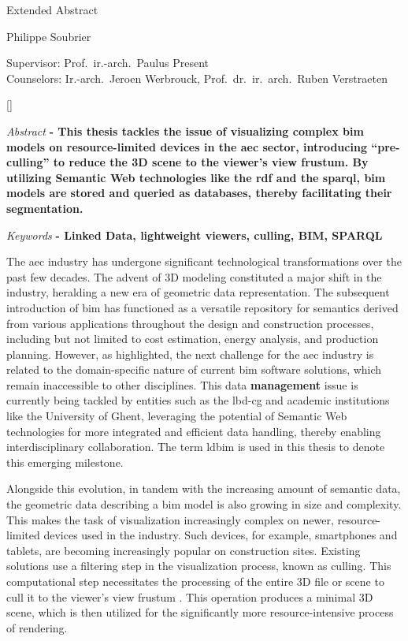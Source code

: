 \begin{center}
    \sffamily
    \huge Extended Abstract

    \Large Philippe Soubrier

    \normalsize
    Supervisor: Prof.\ ir.-arch.\ Paulus Present\\
    Counselors: Ir.-arch.\ Jeroen Werbrouck, Prof.\ dr.\ ir.\ arch.\ Ruben Verstraeten
\end{center}
\begin{refsection}
    []{}
    \begin{multicols}{2}
        \small
        \emph{Abstract} \textbf{
            - This thesis tackles the issue of visualizing complex \ac{bim} models on resource-limited devices in the \ac{aec} sector, introducing \enquote{pre-culling} to reduce the 3D scene to the viewer's view frustum. By utilizing Semantic Web technologies like the \ac{rdf} and the \ac{sparql}, \ac{bim} models are stored and queried as databases, thereby facilitating their segmentation.
        }

        \emph{Keywords} \textbf{
            - Linked Data, lightweight viewers, culling, BIM, SPARQL
        }
    
        The \ac{aec} industry has undergone significant technological transformations over the past few decades. The advent of 3D modeling constituted a major shift in the industry, heralding a new era of geometric data representation. The subsequent introduction of \ac{bim} has functioned as a versatile repository for semantics derived from various applications throughout the design and construction processes, including but not limited to cost estimation, energy analysis, and production planning. However, as \cite{Werbrouck2018} highlighted, the next challenge for the \ac{aec} industry is related to the domain-specific nature of current \ac{bim} software solutions, which remain inaccessible to other disciplines. This data \textbf{management} issue is currently being tackled by entities such as the \ac{lbd-cg} and academic institutions like the University of Ghent, leveraging the potential of Semantic Web technologies for more integrated and efficient data handling, thereby enabling interdisciplinary collaboration. The term \ac{ldbim} is used in this thesis to denote this emerging milestone.

        Alongside this evolution, in tandem with the increasing amount of semantic data, the geometric data describing a \ac{bim} model is also growing in size and complexity. This makes the task of visualization increasingly complex on newer, resource-limited devices used in the industry. Such devices, for example, smartphones and tablets, are becoming increasingly popular on construction sites. Existing solutions use a filtering step in the visualization process, known as culling. This computational step necessitates the processing of the entire 3D file or scene to cull it to the viewer's view frustum \parencite{Johansson2015}. This operation produces a minimal 3D scene, which is then utilized for the significantly more resource-intensive process of rendering.


\end{multicols}
\end{refsection}
